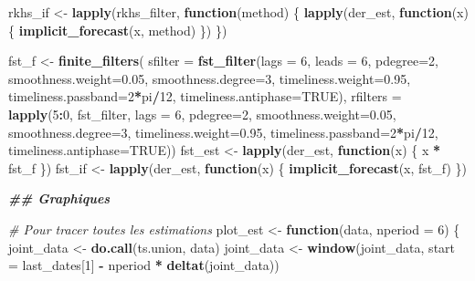 \documentclass[
  12pt,
  a4paper,french]{article}
\newenvironment{Shaded}{\begin{snugshade}}{\end{snugshade}}
\newcommand{\AttributeTok}[1]{\textcolor[rgb]{0.13,0.29,0.53}{#1}}
\newcommand{\CommentTok}[1]{\textcolor[rgb]{0.56,0.35,0.01}{\textit{#1}}}
\newcommand{\ConstantTok}[1]{\textcolor[rgb]{0.56,0.35,0.01}{#1}}
\newcommand{\ControlFlowTok}[1]{\textcolor[rgb]{0.13,0.29,0.53}{\textbf{#1}}}
\newcommand{\DecValTok}[1]{\textcolor[rgb]{0.00,0.00,0.81}{#1}}
\newcommand{\DocumentationTok}[1]{\textcolor[rgb]{0.56,0.35,0.01}{\textbf{\textit{#1}}}}
\newcommand{\FloatTok}[1]{\textcolor[rgb]{0.00,0.00,0.81}{#1}}
\newcommand{\FunctionTok}[1]{\textcolor[rgb]{0.13,0.29,0.53}{\textbf{#1}}}
\newcommand{\NormalTok}[1]{#1}
\newcommand{\OtherTok}[1]{\textcolor[rgb]{0.56,0.35,0.01}{#1}}
\newcommand{\SpecialCharTok}[1]{\textcolor[rgb]{0.81,0.36,0.00}{\textbf{#1}}}
\newcommand\1{\mathds{1}}
\begin{document}
\begin{Shaded}
\begin{Highlighting}[]
\NormalTok{rkhs\_if }\OtherTok{\textless{}{-}} \FunctionTok{lapply}\NormalTok{(rkhs\_filter, }\ControlFlowTok{function}\NormalTok{(method) \{}
  \FunctionTok{lapply}\NormalTok{(der\_est, }\ControlFlowTok{function}\NormalTok{(x) \{}
    \FunctionTok{implicit\_forecast}\NormalTok{(x, method)}
\NormalTok{  \})}
\NormalTok{\})}

\NormalTok{fst\_f }\OtherTok{\textless{}{-}} \FunctionTok{finite\_filters}\NormalTok{(}
  \AttributeTok{sfilter =} \FunctionTok{fst\_filter}\NormalTok{(}\AttributeTok{lags =} \DecValTok{6}\NormalTok{, }\AttributeTok{leads =} \DecValTok{6}\NormalTok{, }\AttributeTok{pdegree=}\DecValTok{2}\NormalTok{, }
                       \AttributeTok{smoothness.weight=}\FloatTok{0.05}\NormalTok{, }\AttributeTok{smoothness.degree=}\DecValTok{3}\NormalTok{,}
                       \AttributeTok{timeliness.weight=}\FloatTok{0.95}\NormalTok{,}
                       \AttributeTok{timeliness.passband=}\DecValTok{2}\SpecialCharTok{*}\NormalTok{pi}\SpecialCharTok{/}\DecValTok{12}\NormalTok{,}
                       \AttributeTok{timeliness.antiphase=}\ConstantTok{TRUE}\NormalTok{),}
  \AttributeTok{rfilters =} \FunctionTok{lapply}\NormalTok{(}\DecValTok{5}\SpecialCharTok{:}\DecValTok{0}\NormalTok{, fst\_filter, }\AttributeTok{lags =} \DecValTok{6}\NormalTok{, }\AttributeTok{pdegree=}\DecValTok{2}\NormalTok{, }
                    \AttributeTok{smoothness.weight=}\FloatTok{0.05}\NormalTok{, }\AttributeTok{smoothness.degree=}\DecValTok{3}\NormalTok{,}
                    \AttributeTok{timeliness.weight=}\FloatTok{0.95}\NormalTok{,}
                    \AttributeTok{timeliness.passband=}\DecValTok{2}\SpecialCharTok{*}\NormalTok{pi}\SpecialCharTok{/}\DecValTok{12}\NormalTok{,}
                    \AttributeTok{timeliness.antiphase=}\ConstantTok{TRUE}\NormalTok{))}
\NormalTok{fst\_est }\OtherTok{\textless{}{-}} \FunctionTok{lapply}\NormalTok{(der\_est, }\ControlFlowTok{function}\NormalTok{(x) \{}
\NormalTok{  x }\SpecialCharTok{*}\NormalTok{ fst\_f}
\NormalTok{\})}
\NormalTok{fst\_if }\OtherTok{\textless{}{-}} \FunctionTok{lapply}\NormalTok{(der\_est, }\ControlFlowTok{function}\NormalTok{(x) \{}
  \FunctionTok{implicit\_forecast}\NormalTok{(x, fst\_f)}
\NormalTok{\})}

\DocumentationTok{\#\# Graphiques}

\CommentTok{\# Pour tracer toutes les estimations}
\NormalTok{plot\_est }\OtherTok{\textless{}{-}} \ControlFlowTok{function}\NormalTok{(data, }\AttributeTok{nperiod =} \DecValTok{6}\NormalTok{) \{}
\NormalTok{  joint\_data }\OtherTok{\textless{}{-}} \FunctionTok{do.call}\NormalTok{(ts.union, data)}
\NormalTok{  joint\_data }\OtherTok{\textless{}{-}} 
    \FunctionTok{window}\NormalTok{(joint\_data,}
           \AttributeTok{start =}\NormalTok{ last\_dates[}\DecValTok{1}\NormalTok{] }\SpecialCharTok{{-}}\NormalTok{ nperiod }\SpecialCharTok{*} \FunctionTok{deltat}\NormalTok{(joint\_data))}
  

\end{Highlighting}
\end{Shaded}
\end{document}
